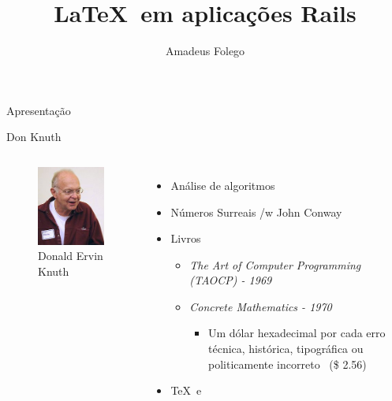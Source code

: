 \documentclass{beamer}
\author{Amadeus Folego}
\title{\LaTeX\ em aplicações Rails}
\date{}
\institute{
  \begin{tabular}{c c}        
    {\em www} & \url{http://badosu.com}\\
    {\em email} & \url{amadeusfolego@gmail.com}
  \end{tabular}
}
\begin{document}
  \begin{frame}[plain] 
    \titlepage
  \end{frame}
  \begin{frame}{Apresentação}
  \end{frame}
  \begin{frame}{Don Knuth}
    \begin{columns}[c]
        \begin{figure}[t]
          \includegraphics[width=\columnwidth]{192px-KnuthAtOpenContentAlliance}
          \caption*{\scriptsize Donald Ervin Knuth}
        \end{figure}
        \begin{itemize}
          \item \pause Análise de algoritmos \pause
          \item Números Surreais /w John Conway \pause
          \item Livros \pause
            \begin{itemize}
              \item {\em The Art of Computer Programming (TAOCP) - 1969} \pause
              \item {\em Concrete Mathematics - 1970} \pause 
              \begin{itemize}
                \item {\scriptsize Um dólar hexadecimal por cada erro técnica, histórica, tipográfica ou politicamente incorreto \ (\$ 2.56)} \pause 
              \end{itemize}
            \end{itemize}
          \item \TeX\ e \MF
        \end{itemize}
    \end{columns}
  \end{frame}
\end{document}
